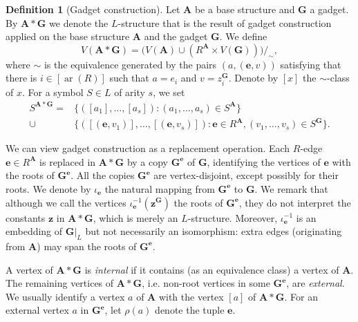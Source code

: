 \documentclass[11pt]{article}
\theoremstyle{plain}
\theoremstyle{definition}
\newtheorem{definition}{Definition}
\theoremstyle{remark}
\DeclareMathOperator\aritysym{ar}
\newcommand{\arity}[1]{{\aritysym({#1})}}
\newcommand{\str}[1]{\mathbf{#1}}
\newcommand{\tpl}[1]{{\bm{#1}}}
\begin{document}
\begin{definition}[Gadget construction]\label{def:gadget_construction}
    Let $\str{A}$ be a base structure and $\str{G}$ a gadget.
    By $\str{A} * \str{G}$ we denote the $L$-structure that is the result of gadget construction applied on the base structure $\str{A}$ and the gadget $\str{G}$.
    We define
    \[
        V(\str{A} * \str{G}) = \big(V(\str{A}) \cup (R^\str{A} \times V(\str{G})) \big) /_{\sim}
        ,
    \]
    where $\sim$ is the equivalence generated by the pairs $(a,(\tpl{e},v))$ satisfying that there is $i \in [\arity{R}]$ such that $a = e_i$ and $v = z_i^\str{G}$.
    Denote by $[x]$ the $\sim$-class of $x$.
    For a symbol $S \in L$ of arity $s$, we set
    \begin{align*}
          S^{\str{A} * \str{G}} 
        = 
             &\{([a_1], \dots, [a_s]) : (a_1, \dots, a_s) \in S^\str{A} \} \\
        \cup &\{([(\tpl{e},v_1)], \dots, [(\tpl{e},v_s)]) : \tpl{e} \in R^\str{A}, (v_1, \dots, v_s) \in S^\str{G}\}
        .
    \end{align*}
\end{definition}


We can view gadget construction as a replacement operation.
Each $R$-edge $\tpl{e} \in R^\str{A}$ is replaced in $\str{A}*\str{G}$ by a copy $\str{G}^\tpl{e}$ of $\str{G}$, identifying the vertices of $\tpl{e}$ with the roots of $\str{G}^\tpl{e}$.
All the copies $\str{G}^\tpl{e}$ are vertex-disjoint, except possibly for their roots.
We denote by $\iota_\tpl{e}$ the natural mapping from $\str{G}^\tpl{e}$ to $\str{G}$.
We remark that although we call the vertices $\iota_\tpl{e}^{-1}(\tpl{z}^\str{G})$ the roots of $\str{G}^\tpl{e}$, they do not interpret the constants $\tpl{z}$ in $\str{A}*\str{G}$, which is merely an $L$-structure.
Moreover, $\iota_\tpl{e}^{-1}$ is an embedding of $\str{G}|_L$ but not necessarily an isomorphism: extra edges (originating from $\str{A}$) may span the roots of $\str{G}^\tpl{e}$.

A vertex of $\str{A}*\str{G}$ is \emph{internal} if it contains (as an equivalence class) a vertex of $\str{A}$.
The remaining vertices of $\str{A}*\str{G}$, i.e. non-root vertices in some $\str{G}^\tpl{e}$, are \emph{external}.
We usually identify a vertex $a$ of $\str{A}$ with the vertex $[a]$ of $\str{A}*\str{G}$.
For an external vertex $a$ in $\str{G}^\tpl{e}$, let $\rho(a)$ denote the tuple $\tpl{e}$.
\end{document}
